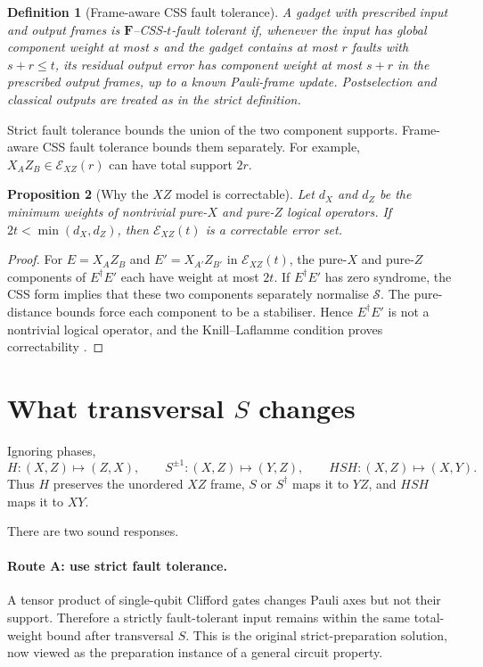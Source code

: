 \documentclass[11pt]{article}
\newtheorem{definition}{Definition}[section]
\newtheorem{proposition}[definition]{Proposition}
\theoremstyle{remark}
\newcommand{\cS}{\mathcal S}
\newcommand{\cE}{\mathcal E}
\begin{document}
\begin{definition}[Frame-aware CSS fault tolerance]
A gadget with prescribed input and output frames is
\emph{$\boldsymbol F$--CSS-$t$-fault tolerant} if, whenever the input has
global component weight at most $s$ and the gadget contains at most $r$
faults with $s+r\leq t$, its residual output error has component weight at
most $s+r$ in the prescribed output frames, up to a known Pauli-frame
update.  Postselection and classical outputs are treated as in the strict
definition.
\end{definition}

Strict fault tolerance bounds the union of the two component supports.
Frame-aware CSS fault tolerance bounds them separately.  For example,
$X_AZ_B\in\cE_{XZ}(r)$ can have total support $2r$.

\begin{proposition}[Why the $XZ$ model is correctable]
Let $d_X$ and $d_Z$ be the minimum weights of nontrivial pure-$X$ and
pure-$Z$ logical operators.  If $2t<\min(d_X,d_Z)$, then
$\cE_{XZ}(t)$ is a correctable error set.
\end{proposition}

\begin{proof}
For $E=X_AZ_B$ and $E'=X_{A'}Z_{B'}$ in $\cE_{XZ}(t)$, the pure-$X$ and
pure-$Z$ components of $E^\dagger E'$ each have weight at most $2t$.  If
$E^\dagger E'$ has zero syndrome, the CSS form implies that these two
components separately normalise $\cS$.  The pure-distance bounds force each
component to be a stabiliser.  Hence $E^\dagger E'$ is not a nontrivial
logical operator, and the Knill--Laflamme condition proves correctability
\cite{KnillLaflamme}.
\end{proof}

\section{What transversal \texorpdfstring{$S$}{S} changes}

Ignoring phases,
\[
 H:(X,Z)\mapsto(Z,X),\qquad
 S^{\pm1}:(X,Z)\mapsto(Y,Z),\qquad
 HSH:(X,Z)\mapsto(X,Y).
 \tag{4}
\]
Thus $H$ preserves the unordered $XZ$ frame, $S$ or $S^\dagger$ maps it to
$YZ$, and $HSH$ maps it to $XY$.

There are two sound responses.

\paragraph{Route A: use strict fault tolerance.}
A tensor product of single-qubit Clifford gates changes Pauli axes but not
their support.  Therefore a strictly fault-tolerant input remains within
the same total-weight bound after transversal $S$.  This is the original
strict-preparation solution, now viewed as the preparation instance of a
general circuit property.
\end{document}
